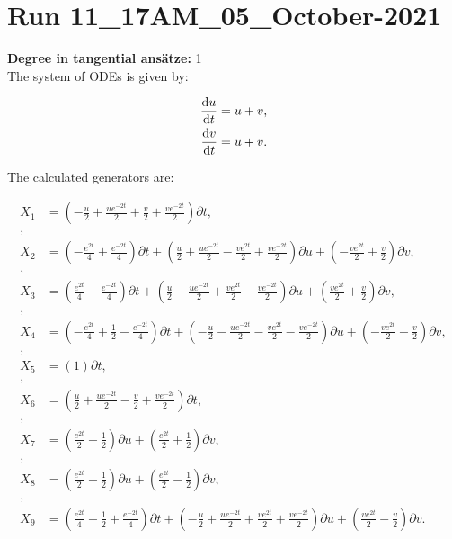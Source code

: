 \section*{Run 11\_17AM\_05\_October-2021}
\textbf{Degree in tangential ansätze:}	1\\
The system of ODEs is given by:

\begin{align*}
\dv{u}{t}&=u + v,\\
\dv{v}{t}&=u + v.\\
\end{align*}

\noindent The calculated generators are:

\begin{align*}
X_{1}&=\left( - \frac{u}{2} + \frac{u e^{- 2 t}}{2} + \frac{v}{2} + \frac{v e^{- 2 t}}{2} \right)\partial t,\\
,\\
X_{2}&=\left( - \frac{e^{2 t}}{4} + \frac{e^{- 2 t}}{4} \right)\partial t+\left( \frac{u}{2} + \frac{u e^{- 2 t}}{2} - \frac{v e^{2 t}}{2} + \frac{v e^{- 2 t}}{2} \right)\partial u+\left( - \frac{v e^{2 t}}{2} + \frac{v}{2} \right)\partial v,\\
,\\
X_{3}&=\left( \frac{e^{2 t}}{4} - \frac{e^{- 2 t}}{4} \right)\partial t+\left( \frac{u}{2} - \frac{u e^{- 2 t}}{2} + \frac{v e^{2 t}}{2} - \frac{v e^{- 2 t}}{2} \right)\partial u+\left( \frac{v e^{2 t}}{2} + \frac{v}{2} \right)\partial v,\\
,\\
X_{4}&=\left( - \frac{e^{2 t}}{4} + \frac{1}{2} - \frac{e^{- 2 t}}{4} \right)\partial t+\left( - \frac{u}{2} - \frac{u e^{- 2 t}}{2} - \frac{v e^{2 t}}{2} - \frac{v e^{- 2 t}}{2} \right)\partial u+\left( - \frac{v e^{2 t}}{2} - \frac{v}{2} \right)\partial v,\\
,\\
X_{5}&=\left( 1 \right)\partial t,\\
,\\
X_{6}&=\left( \frac{u}{2} + \frac{u e^{- 2 t}}{2} - \frac{v}{2} + \frac{v e^{- 2 t}}{2} \right)\partial t,\\
,\\
X_{7}&=\left( \frac{e^{2 t}}{2} - \frac{1}{2} \right)\partial u+\left( \frac{e^{2 t}}{2} + \frac{1}{2} \right)\partial v,\\
,\\
X_{8}&=\left( \frac{e^{2 t}}{2} + \frac{1}{2} \right)\partial u+\left( \frac{e^{2 t}}{2} - \frac{1}{2} \right)\partial v,\\
,\\
X_{9}&=\left( \frac{e^{2 t}}{4} - \frac{1}{2} + \frac{e^{- 2 t}}{4} \right)\partial t+\left( - \frac{u}{2} + \frac{u e^{- 2 t}}{2} + \frac{v e^{2 t}}{2} + \frac{v e^{- 2 t}}{2} \right)\partial u+\left( \frac{v e^{2 t}}{2} - \frac{v}{2} \right)\partial v.\\
\end{align*}
